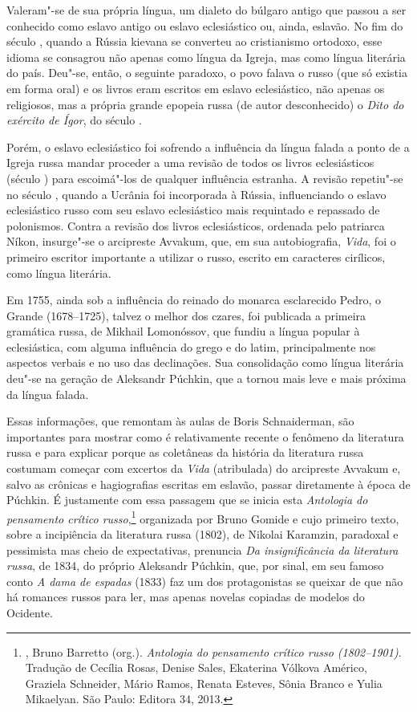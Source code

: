 Valeram"-se de sua própria língua, um dialeto do búlgaro antigo que
passou a ser conhecido como eslavo antigo ou eslavo eclesiástico ou,
ainda, eslavão. No fim do século , quando a Rússia kievana se
converteu ao cristianismo ortodoxo, esse idioma se consagrou não apenas
como língua da Igreja, mas como língua literária do país. Deu"-se, então,
o seguinte paradoxo, o povo falava o russo (que só existia em forma
oral) e os livros eram
escritos em eslavo eclesiástico, não apenas os religiosos, mas a própria
grande epopeia russa (de autor desconhecido) o \emph{Dito do exército de
Ígor}, do século .

Porém, o eslavo eclesiástico foi sofrendo a influência da língua falada
a ponto de a Igreja russa mandar proceder a uma revisão de todos os
livros eclesiásticos (século ) para escoimá"-los de qualquer
influência estranha. A revisão repetiu"-se no século , quando a
Ucrânia foi incorporada à Rússia, influenciando o eslavo eclesiástico
russo com seu eslavo eclesiástico mais requintado e repassado de
polonismos. Contra a revisão dos livros eclesiásticos, ordenada pelo
patriarca Níkon, insurge"-se o arcipreste Avvakum, que, em sua
autobiografia, \emph{Vida}, foi o primeiro escritor importante a
utilizar o russo, escrito em caracteres cirílicos, como língua literária.

Em 1755, ainda sob a influência do reinado do monarca esclarecido Pedro, o
Grande (1678--1725), talvez o melhor dos czares, foi publicada a primeira
gramática russa, de Mikhail Lomonóssov, que fundiu a língua popular à
eclesiástica, com alguma influência do grego e do latim,
 principalmente nos aspectos verbais e no uso das declinações. Sua
consolidação como língua literária deu"-se na geração de Aleksandr Púchkin, que a tornou mais leve e mais
próxima da língua falada.

Essas informações, que remontam às aulas de Boris Schnaiderman, são
importantes para mostrar como é relativamente recente o fenômeno da
literatura russa e para explicar porque as coletâneas da história
da literatura russa costumam começar com excertos da \emph{Vida} (atribulada) do arcipreste Avvakum e, salvo as crônicas e hagiografias
escritas em eslavão, passar diretamente à época de Púchkin. É
justamente com essa passagem que se inicia esta \emph{Antologia do
pensamento crítico russo},\footnote{, Bruno Barretto
 (org.). \emph{Antologia do pensamento crítico russo (1802--1901)}.
 Tradução de Cecília Rosas, Denise Sales, Ekaterina Vólkova Américo,
 Graziela Schneider, Mário Ramos, Renata Esteves, Sônia Branco e Yulia
 Mikaelyan. São Paulo: Editora 34, 2013.} organizada por Bruno Gomide e cujo
primeiro texto, sobre a incipiência da literatura russa (1802), de
Nikolai Karamzin, paradoxal e pessimista mas cheio de expectativas,
prenuncia \emph{Da insignificância da literatura russa}, de 1834, do
próprio Aleksandr Púchkin, que, por sinal, em seu famoso conto \emph{A dama
de espadas} (1833) faz um dos protagonistas se queixar de que não há romances
russos para ler, mas apenas novelas copiadas de modelos do Ocidente.

